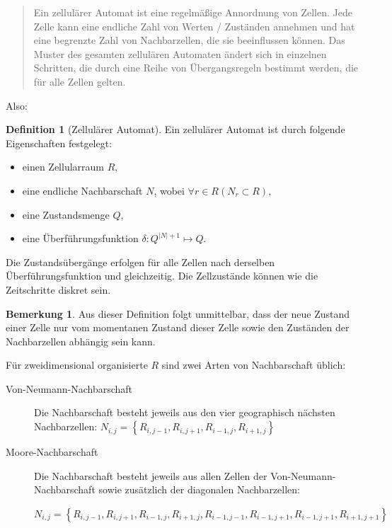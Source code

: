 \documentclass[11pt]{article} %
\theoremstyle{definition}
\newtheorem{definition}{Definition}
\newtheorem*{bemerkung}{Bemerkung}
\begin{document}
\begin{quote}Ein zellulärer Automat ist eine regelmäßige Annordnung von Zellen. Jede Zelle kann eine endliche Zahl
von Werten / Zuständen annehmen und hat eine begrenzte Zahl von Nachbarzellen, die sie beeinflussen
können. Das Muster des gesamten zellulären Automaten ändert sich in einzelnen Schritten, die durch eine
Reihe von Übergangsregeln bestimmt werden, die für alle Zellen gelten.\cite{beckmann}\end{quote}

Also:

\begin{definition}[Zellulärer Automat] Ein zellulärer Automat ist durch folgende Eigenschaften festgelegt:
\begin{itemize}
\item einen Zellularraum $R$,
\item eine endliche Nachbarschaft $N$, wobei $\forall r \in R \left(N_r \subset R\right)$,
\item eine Zustandsmenge $Q$,
\item eine Überführungsfunktion $\delta: Q^{|N| + 1}\mapsto Q$.
\end{itemize}
Die Zustandsübergänge erfolgen für alle Zellen nach derselben Überführungsfunktion und gleichzeitig. Die Zellzustände können wie die Zeitschritte diskret sein. \cite{wiki:zellautomat}

\end{definition}

\begin{bemerkung}
Aus dieser Definition folgt unmittelbar, dass der neue Zustand einer Zelle nur vom momentanen Zustand dieser Zelle sowie den Zuständen der Nachbarzellen abhängig sein kann.
\end{bemerkung}

Für zweidimensional organisierte $R$ sind zwei Arten von Nachbarschaft üblich:
\begin{description}
\item[Von-Neumann-Nachbarschaft] Die Nachbarschaft besteht jeweils aus den vier geographisch nächsten Nachbarzellen: $N_{i,j} = \left\{ R_{i,j-1}, R_{i,j+1}, R_{i-1,j}, R_{i+1,j}\right\}$
\item[Moore-Nachbarschaft] Die Nachbarschaft besteht jeweils aus allen Zellen der Von-Neumann-Nachbarschaft sowie zusätzlich der diagonalen Nachbarzellen:

$N_{i,j} = \left\{ R_{i,j-1}, R_{i,j+1}, R_{i-1,j}, R_{i+1,j},R_{i-1,j-1}, R_{i-1,j+1}, R_{i-1,j+1}, R_{i+1,j+1} \right\}$ \cite{schurr}
\end{description}
\end{document}
